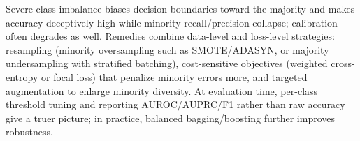 Severe class imbalance biases decision boundaries toward the majority and makes accuracy deceptively high while minority recall/precision collapse; calibration often degrades as well. Remedies combine data-level and loss-level strategies: resampling (minority oversampling such as SMOTE/ADASYN, or majority undersampling with stratified batching), cost-sensitive objectives (weighted cross-entropy or focal loss) that penalize minority errors more, and targeted augmentation to enlarge minority diversity. At evaluation time, per-class threshold tuning and reporting AUROC/AUPRC/F1 rather than raw accuracy give a truer picture; in practice, balanced bagging/boosting further improves robustness.
